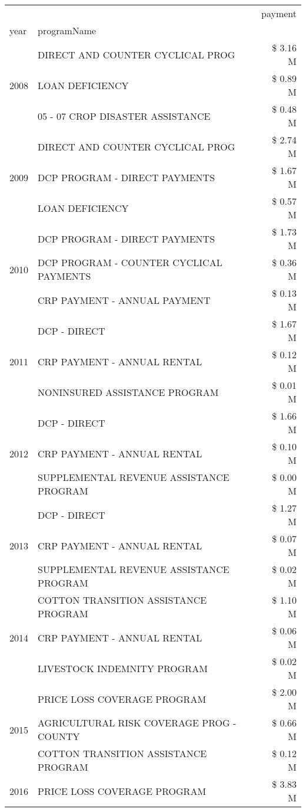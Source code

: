 \begin{tabular}{llr}
\toprule
 &  & payment \\
year & programName &  \\
\midrule
\multirow[t]{3}{*}{2008} & DIRECT AND COUNTER CYCLICAL PROG & \$ 3.16 M \\
 & LOAN DEFICIENCY & \$ 0.89 M \\
 & 05 - 07 CROP DISASTER ASSISTANCE & \$ 0.48 M \\
\cline{1-3}
\multirow[t]{3}{*}{2009} & DIRECT AND COUNTER CYCLICAL PROG & \$ 2.74 M \\
 & DCP PROGRAM - DIRECT PAYMENTS & \$ 1.67 M \\
 & LOAN DEFICIENCY & \$ 0.57 M \\
\cline{1-3}
\multirow[t]{3}{*}{2010} & DCP PROGRAM - DIRECT PAYMENTS & \$ 1.73 M \\
 & DCP PROGRAM - COUNTER CYCLICAL PAYMENTS & \$ 0.36 M \\
 & CRP PAYMENT - ANNUAL PAYMENT & \$ 0.13 M \\
\cline{1-3}
\multirow[t]{3}{*}{2011} & DCP - DIRECT & \$ 1.67 M \\
 & CRP PAYMENT - ANNUAL RENTAL & \$ 0.12 M \\
 & NONINSURED ASSISTANCE PROGRAM & \$ 0.01 M \\
\cline{1-3}
\multirow[t]{3}{*}{2012} & DCP - DIRECT & \$ 1.66 M \\
 & CRP PAYMENT - ANNUAL RENTAL & \$ 0.10 M \\
 & SUPPLEMENTAL REVENUE ASSISTANCE PROGRAM & \$ 0.00 M \\
\cline{1-3}
\multirow[t]{3}{*}{2013} & DCP - DIRECT & \$ 1.27 M \\
 & CRP PAYMENT - ANNUAL RENTAL & \$ 0.07 M \\
 & SUPPLEMENTAL REVENUE ASSISTANCE PROGRAM & \$ 0.02 M \\
\cline{1-3}
\multirow[t]{3}{*}{2014} & COTTON TRANSITION ASSISTANCE PROGRAM & \$ 1.10 M \\
 & CRP PAYMENT - ANNUAL RENTAL & \$ 0.06 M \\
 & LIVESTOCK INDEMNITY PROGRAM & \$ 0.02 M \\
\cline{1-3}
\multirow[t]{3}{*}{2015} & PRICE LOSS COVERAGE PROGRAM & \$ 2.00 M \\
 & AGRICULTURAL RISK COVERAGE PROG - COUNTY & \$ 0.66 M \\
 & COTTON TRANSITION ASSISTANCE PROGRAM & \$ 0.12 M \\
\cline{1-3}
\multirow[t]{3}{*}{2016} & PRICE LOSS COVERAGE PROGRAM & \$ 3.83 M \\

\end{tabular}
